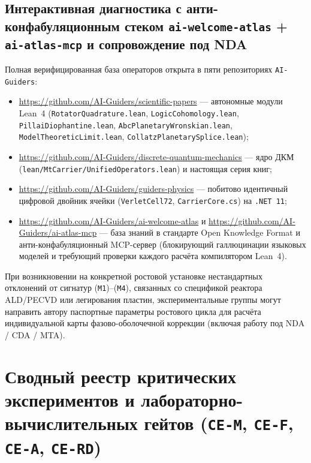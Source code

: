 \section{Интерактивная диагностика с анти-конфабуляционным стеком \texttt{ai-welcome-atlas} + \texttt{ai-atlas-mcp} и сопровождение под NDA}

Полная верифицированная база операторов открыта в пяти репозиториях \texttt{AI-Guiders}:
\begin{itemize}[noitemsep]
\item \url{https://github.com/AI-Guiders/scientific-papers} --- автономные модули Lean~4 (\texttt{RotatorQuadrature.lean}, \texttt{LogicCohomology.lean}, \texttt{PillaiDiophantine.lean}, \texttt{AbcPlanetaryWronskian.lean}, \texttt{ModelTheoreticLimit.lean}, \texttt{CollatzPlanetarySplice.lean});
\item \url{https://github.com/AI-Guiders/discrete-quantum-mechanics} --- ядро ДКМ (\texttt{lean/MtCarrier/UnifiedOperators.lean}) и настоящая серия книг;
\item \url{https://github.com/AI-Guiders/guiders-physics} --- побитово идентичный цифровой двойник ячейки (\texttt{VerletCell72}, \texttt{CarrierCore.cs}) на \texttt{.NET~11};
\item \url{https://github.com/AI-Guiders/ai-welcome-atlas} и \url{https://github.com/AI-Guiders/ai-atlas-mcp} --- база знаний в стандарте Open Knowledge Format и анти-конфабуляционный MCP-сервер (блокирующий галлюцинации языковых моделей и требующий проверки каждого расчёта компилятором Lean~4).
\end{itemize}
При возникновении на конкретной ростовой установке нестандартных отклонений от сигнатур (\texttt{M1})--(\texttt{M4}), связанных со спецификой реактора ALD/PECVD или легирования пластин, экспериментальные группы могут направить автору паспортные параметры ростового цикла для расчёта индивидуальной карты фазово-оболочечной коррекции (включая работу под NDA / CDA / MTA).

\chapter{Сводный реестр критических экспериментов и лабораторно-вычислительных гейтов (\texttt{CE-M}, \texttt{CE-F}, \texttt{CE-A}, \texttt{CE-RD})}
\label{ch:lab-critical-experiments-registry}

